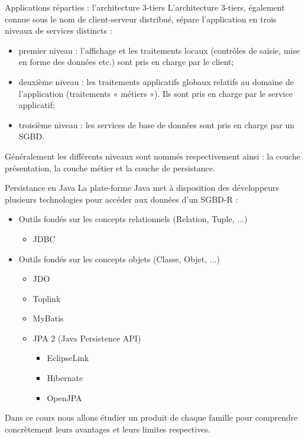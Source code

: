 \documentclass[xcolor=pdftex,x11names,table]{beamer}
\begin{document}
    \begin{frame}{Applications réparties : l'architecture 3-tiers}
      L'architecture 3-tiers, également connue sous le nom de client-serveur distribué, sépare l'application en 
      trois niveaux de services distincts :
      \begin{itemize} 
        \item premier niveau : l'affichage et les traitements locaux (contrôles de saisie, mise en forme des données
        etc.) sont pris en charge par le client;
        \item deuxième niveau : les traitements applicatifs globaux relatifs au domaine de l'application (traitements « métiers »).
        Ils sont pris en charge par le service applicatif;
        \item troisième niveau : les services de base de données sont pris en charge par un SGBD.
      \end{itemize}
      Généralement les différents niveaux sont nommés respectivement ainsi : la couche présentation, la couche métier et la couche de persistance.
    \end{frame}
    
    \begin{frame}{Persistance en Java}
      La plate-forme Java met à disposition des développeurs plusieurs technologies pour accéder aux données d'un SGBD-R :
      \pause
      \begin{itemize} 
        \item Outils fondés sur les concepts relationnels (Relation, Tuple, ...)
          \begin{itemize} 
            \item JDBC
          \end{itemize}\pause
          \item Outils fondés sur les concepts objets (Classe, Objet, ...)
          \begin{itemize} 
            \item JDO
            \item Toplink
            \item MyBatis
            \item JPA 2 (Java Persistence API)
              \begin{itemize}
                \item EclipseLink
                \item Hibernate
                \item OpenJPA
              \end{itemize}
          \end{itemize}                            
      \end{itemize}
      \pause
      Dans ce cours nous allons étudier un produit de chaque famille pour comprendre concrètement leurs avantages et 
      leurs limites respectives.        
    \end{frame}
\end{document}
